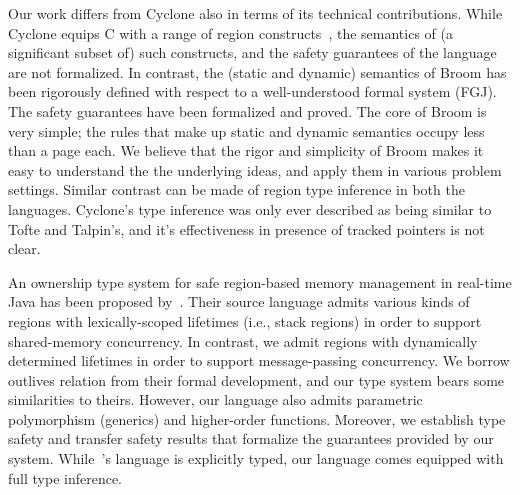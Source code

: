 Our work differs from Cyclone also in terms of its technical
contributions. While Cyclone equips C with a range of region
constructs~\cite{cycloneSCP}, the semantics of (a significant subset
of) such constructs, and the safety guarantees of the language are not
formalized. In contrast, the (static and dynamic) semantics of Broom
has been rigorously defined with respect to a well-understood formal
system (FGJ). The safety guarantees have been formalized and proved.
The core of Broom is very simple; the rules that make up static and
dynamic semantics occupy less than a page each. We believe that the
rigor and simplicity of Broom makes it easy to understand the the
underlying ideas, and apply them in various problem settings. Similar
contrast can be made of region type inference in both the languages.
Cyclone’s type inference was only ever described as being similar to
Tofte and Talpin’s, and it’s effectiveness in presence of tracked
pointers is not clear.

An ownership type system for safe region-based memory management in
real-time Java has been proposed by~\cite{MIT03}.  
Their source language admits various kinds of regions with
lexically-scoped lifetimes (i.e., stack regions) in order to support
shared-memory concurrency. In contrast, we admit regions with
dynamically determined lifetimes in order to support message-passing
concurrency. We borrow outlives relation from their formal
development, and our type system bears some similarities to theirs.
However, our language also admits parametric polymorphism (generics)
and higher-order functions.
Moreover, we establish type safety and transfer safety results that
formalize the guarantees provided by our system. While~\cite{MIT03}'s
language is explicitly typed, our language comes equipped with full
type inference.

